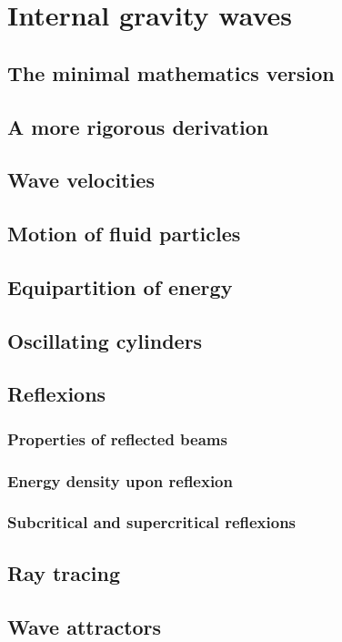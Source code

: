 \newpage
\section{Internal gravity waves}
\subsection{The minimal mathematics version}
\subsection{A more rigorous derivation}
\subsection{Wave velocities}
\subsection{Motion of fluid particles}
\subsection{Equipartition of energy}
\subsection{Oscillating cylinders}
\subsection{Reflexions}
\subsubsection{Properties of reflected beams}
\subsubsection{Energy density upon reflexion}
\subsubsection{Subcritical and supercritical reflexions}

\subsection{Ray tracing}

\subsection{Wave attractors}
